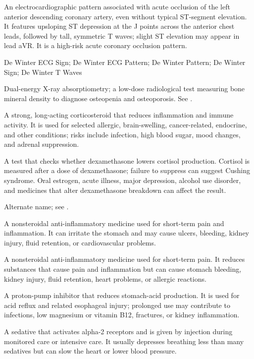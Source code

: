  An electrocardiographic pattern associated with acute occlusion of the left anterior descending coronary artery, even without typical ST-segment elevation. It features upsloping ST depression at the J points across the anterior chest leads, followed by tall, symmetric T waves; slight ST elevation may appear in lead aVR. It is a high-risk acute coronary occlusion pattern.

\synonyms
De Winter ECG Sign; De Winter ECG Pattern; De Winter Pattern; De Winter Sign; De Winter T Waves

 Dual-energy X-ray absorptiometry; a low-dose radiological test measuring bone mineral density to diagnose osteopenia and osteoporosis. See .

 A strong, long-acting corticosteroid that reduces inflammation and immune activity. It is used for selected allergic, brain-swelling, cancer-related, endocrine, and other conditions; risks include infection, high blood sugar, mood changes, and adrenal suppression.

 A test that checks whether dexamethasone lowers cortisol production. Cortisol is measured after a dose of dexamethasone; failure to suppress can suggest Cushing syndrome. Oral estrogen, acute illness, major depression, alcohol use disorder, and medicines that alter dexamethasone breakdown can affect the result.

 Alternate name; see .


 A nonsteroidal anti-inflammatory medicine used for short-term pain and inflammation. It can irritate the stomach and may cause ulcers, bleeding, kidney injury, fluid retention, or cardiovascular problems.

 A nonsteroidal anti-inflammatory medicine used for short-term pain. It reduces substances that cause pain and inflammation but can cause stomach bleeding, kidney injury, fluid retention, heart problems, or allergic reactions.

 A proton-pump inhibitor that reduces stomach-acid production. It is used for acid reflux and related esophageal injury; prolonged use may contribute to infections, low magnesium or vitamin B12, fractures, or kidney inflammation.

 A sedative that activates alpha-2 receptors and is given by injection during monitored care or intensive care. It usually depresses breathing less than many sedatives but can slow the heart or lower blood pressure.

